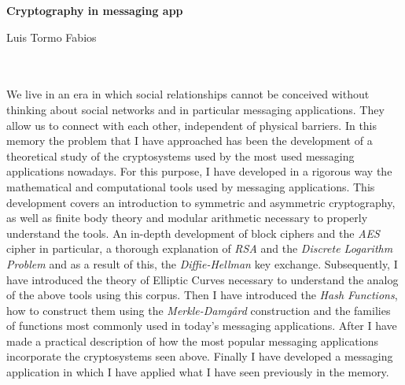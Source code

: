 \thispagestyle{empty}


\begin{center}
{\large\bfseries Cryptography in messaging app}\\
\end{center}
\begin{center}
Luis Tormo Fabios\\
\end{center}

\\

\vspace{0.7cm}
\\

We live in an era in which social relationships cannot be conceived without thinking about social networks and in particular messaging applications. They allow us to connect with each other, independent of physical barriers.
In this memory the problem that I have approached has been the development of a theoretical study of the cryptosystems used by the most used messaging applications nowadays. For this purpose, I have developed in a rigorous way the mathematical and computational tools used by messaging applications. This development covers an introduction to symmetric and asymmetric cryptography, as well as finite body theory and modular arithmetic necessary to properly understand the tools.
An in-depth development of block ciphers and the \emph{AES} cipher in particular, a thorough explanation of \emph{RSA} and the \emph{Discrete Logarithm Problem} and as a result of this, the \emph{Diffie-Hellman} key exchange. Subsequently, I have introduced the theory of Elliptic Curves necessary to understand the analog of the above tools using this corpus.
Then I have introduced the \emph{Hash Functions}, how to construct them using the \emph{Merkle-Damgård} construction and the families of functions most commonly used in today's messaging applications. After I have made a practical description of how the most popular messaging applications incorporate the cryptosystems seen above. Finally I have developed a messaging application in which I have applied what I have seen previously in the memory. 

\chapter*{}
\thispagestyle{empty}


